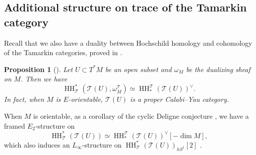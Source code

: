 \documentclass[11pt]{amsart}
\numberwithin{equation}{section}
\theoremstyle{plain}
\newtheorem{Prop}[prop]{Proposition}
\theoremstyle{definition}
\theoremstyle{remark}
\newcommand{\sT} { {\mathscr{T}}}
\newcommand\HH{\operatorname{HH}}
\begin{document}
\subsection{Additional structure on trace of the Tamarkin category}
Recall that we also have a duality between Hochschild homology and cohomology of the Tamarkin categories, proved in \cite[Proposition 7.2]{Hochschild-Kuo-Shende-Zhang}.

\begin{Prop}[{\cite[Proposition 7.2 \& Corollary 7.3]{Hochschild-Kuo-Shende-Zhang}}]\label{prop:CY}
Let $U \subset T^*M$ be an open subset and $\omega_M$ be the dualizing sheaf on $M$. Then we have
\[\HH^*_\sT(\sT(U), \omega_M^\sT) \simeq \HH^\sT_*(\sT(U))^\vee.\]
In fact, when $M$ is $E$-orientable, $\sT(U)$ is a proper Calabi--Yau category.
\end{Prop}

When $M$ is orientable, as a corollary of the cyclic Deligne conjecture \cite{Brav-Rozenblyum}, we have a framed $E_2$-structure on 
\[\HH^*_\sT(\sT(U)) \simeq \HH_*^\sT(\sT(U))^\vee[-\dim M],\]
which also induces an $L_\infty$-structure on $\HH^*_\sT(\sT(U))_{hS^1}[2]$ \cite{Westerland-Equiv-Operad}.
\end{document}
